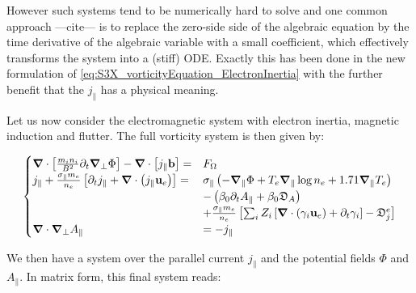 However such systems tend to be numerically hard to solve and one common approach ---cite--- is to replace the zero-side side of the algebraic equation by the time derivative of the algebraic variable with a small coefficient, which effectively transforms the system into a (stiff) ODE. Exactly this has been done in the new formulation of \autoref{eq:S3X_vorticityEquation_ElectronInertia} with the further benefit that the $j_\parallel$ has a physical meaning.

Let us now consider the electromagnetic system with electron inertia, magnetic induction and flutter. The full vorticity system is then given by: 

\begin{equation}
	\label{eq:S3X_vorticityEquation_FullElectromagnetic}
	\begin{cases}
		\grad\cdot\left[\frac{m_i n_i}{ B^2}\partial_t\grad_\perp\Phi\right] - \grad\cdot\left[j_\parallel\mathbf{b}\right]=& F_\Omega \\
		j_\parallel + \frac{\sigma_\parallel m_e}{n_e}\left[\partial_t j_\parallel + \grad\cdot\left(j_\parallel\mathbf{u}_e\right)\right] =& \sigma_\parallel \left(-\grad_\parallel\Phi + T_e\grad_\parallel\log n_e + 1.71\grad_\parallel T_e\right) \\ 
		& - \left(\beta_0\partial_t A_\parallel + \beta_0\mathfrak{D}_A \right) \\		
		& + \frac{\sigma_\parallel m_e}{n_e}\left[\sum_iZ_i\left[\grad\cdot\left(\gamma_i\mathbf{u}_e \right) + \partial_t \gamma_i\right] - \mathfrak{D}_j^e\right] \\
		\grad\cdot\grad_\perp A_\parallel& = -j_\parallel
	\end{cases}
\end{equation}

 We then have a system over the parallel current $j_\parallel$ and the potential fields $\Phi$ and $A_\parallel$. In matrix form, this final system reads:

